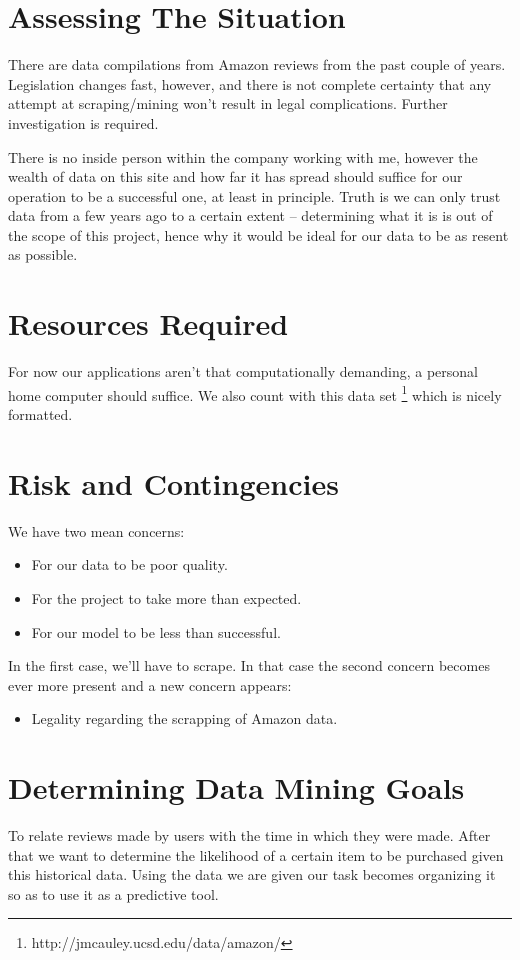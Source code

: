 \documentclass{article}
\begin{document}
\section*{Assessing The Situation}

There are data compilations from Amazon reviews from the past couple of years. Legislation changes fast, however, and there is not complete certainty that any attempt at scraping/mining won't result in legal complications. Further investigation is required.

There is no inside person within the company working with me, however the wealth of data on this site and how far it has spread should suffice for our operation to be a successful one, at least in principle. Truth is we can only trust data from a few years ago to a certain extent -- determining what it is is out of the scope of this project, hence why it would be ideal for our data to be as resent as possible.

\section*{Resources Required}

For now our applications aren't that computationally demanding, a personal home computer should suffice. We also count with this data set \footnote{http://jmcauley.ucsd.edu/data/amazon/} which is nicely formatted. 

\section*{Risk and Contingencies}

We have two mean concerns:
\begin{itemize}
    \item For our data to be poor quality.
    \item For the project to take more than expected.
    \item For our model to be less than successful.
\end{itemize}

In the first case, we'll have to scrape. In that case the second concern becomes ever more present and a new concern appears:

\begin{itemize}
    \item Legality regarding the scrapping of Amazon data.
\end{itemize}
\section*{Determining Data Mining Goals}
To relate reviews made by users with the time in which they were made. After that we want to determine the likelihood of a certain item to be purchased given this historical data. Using the data we are given our task becomes organizing it so as to use it as a predictive tool.
\end{document}
